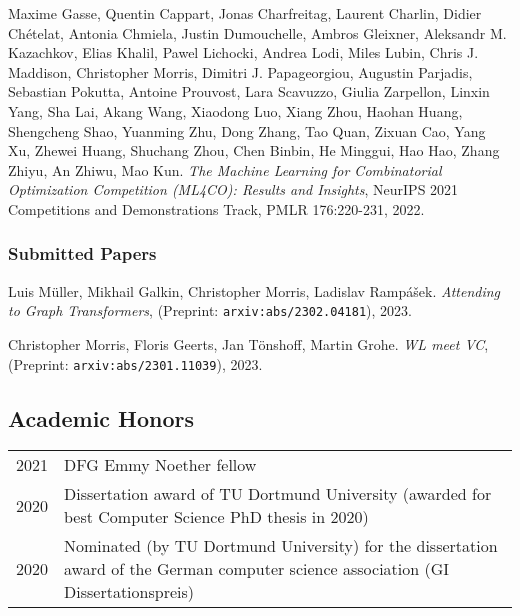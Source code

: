 \documentclass[10pt, a4paper, DIV=12, headings=small]{scrartcl}
\begin{document}
\begin{thebibliography}{15}
	Maxime Gasse, Quentin Cappart, Jonas Charfreitag, Laurent Charlin, Didier Chételat, Antonia Chmiela, Justin Dumouchelle, Ambros Gleixner, Aleksandr M. Kazachkov, Elias Khalil, Pawel Lichocki, Andrea Lodi, Miles Lubin, Chris J. Maddison, Christopher Morris, Dimitri J. Papageorgiou, Augustin Parjadis, Sebastian Pokutta, Antoine Prouvost, Lara Scavuzzo, Giulia Zarpellon, Linxin Yang, Sha Lai, Akang Wang, Xiaodong Luo, Xiang Zhou, Haohan Huang, Shengcheng Shao, Yuanming Zhu, Dong Zhang, Tao Quan, Zixuan Cao, Yang Xu, Zhewei Huang, Shuchang Zhou, Chen Binbin, He Minggui, Hao Hao, Zhang Zhiyu, An Zhiwu, Mao Kun.
	\emph{The Machine Learning for Combinatorial Optimization Competition (ML4CO): Results and Insights}, NeurIPS 2021 Competitions and Demonstrations Track, PMLR 176:220-231, 2022.

	\subsubsection*{Submitted Papers}

	Luis Müller, Mikhail Galkin, Christopher Morris, Ladislav Rampášek.
	\emph{Attending to Graph Transformers}, (Preprint: \texttt{arxiv:abs/2302.04181}), 2023.

	Christopher Morris, Floris Geerts, Jan Tönshoff, Martin Grohe.
	\emph{WL meet VC}, (Preprint: \texttt{arxiv:abs/2301.11039}), 2023.
\end{thebibliography}

\subsection*{Academic Honors}
 \tabulinesep=0.8mm
\begin{longtabu}{p{2.1cm}p{12.0cm}}
	2021 & DFG Emmy Noether fellow                                                                                                             \\
	2020 & Dissertation award of TU Dortmund University (awarded for best Computer Science PhD thesis in 2020)                                 \\
	2020 & Nominated (by TU Dortmund University) for the dissertation award of the German computer science association (GI Dissertationspreis) \\
\end{longtabu}
\end{document}
